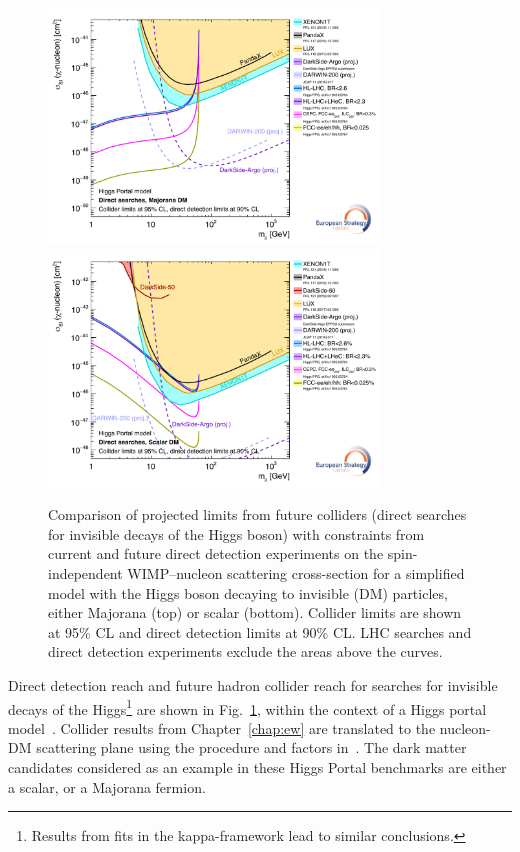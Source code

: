 \documentclass[../report.tex]{subfiles}
\begin{document}
\begin{figure}[!htbp]
    \centering
    \includegraphics[width=0.78\textwidth]{Darkmatter/section2/img/DMCombinationDD_12May19_Internal_V1SInucleonMajorana}\\
    \includegraphics[width=0.78\textwidth]{Darkmatter/section2/img/DMCombinationDD_12May19_Internal_V1SInucleonScalar}
    \caption{Comparison of projected limits from future colliders (direct searches for invisible decays of the Higgs boson) with constraints from current and future direct detection experiments on the spin-independent WIMP--nucleon scattering cross-section for a simplified model with the Higgs boson decaying to invisible  (DM) particles, either Majorana (top) or scalar (bottom). Collider limits are shown at 95\% CL and direct detection limits at 90\% CL. 
    LHC searches and direct detection experiments exclude the areas above the curves. }
    \label{fig:Higgs_CollidersDD}
\end{figure}

Direct detection reach and future hadron collider reach for searches for invisible decays of the Higgs\footnote{Results from fits in the kappa-framework lead to similar conclusions.} are shown in Fig.~\ref{fig:Higgs_CollidersDD}, within the context of a Higgs portal model~\cite{Patt:2006fw,Djouadi:2011aa}. Collider results from Chapter~\ref{chap:ew} are translated to the nucleon-DM scattering plane using the procedure and factors in~\cite{Fox:2011pm, Hoferichter:2017olk}. 
The dark matter candidates considered as an example in these Higgs Portal benchmarks are either a scalar, or a Majorana fermion.
\end{document}

